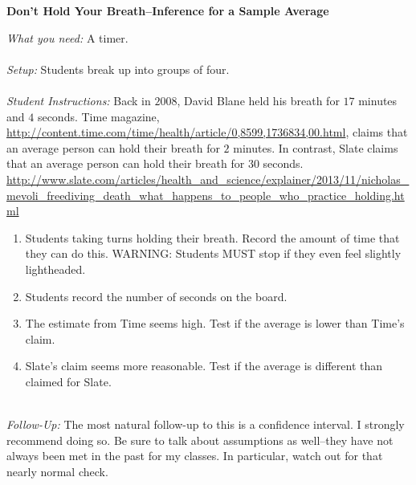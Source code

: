\documentclass[12pt]{amsart}
\theoremstyle{definition}
\begin{document}
     \begin{framed}
     	\begin{center} \textbf{Don't Hold Your Breath--Inference for a Sample Average} \end{center}
     	\emph{What you need:} A timer.\\
     	~\\
     	\emph{Setup:} Students break up into groups of four.\\
     	~\\
     	\emph{Student Instructions:} Back in $2008$, David Blane held his breath for $17$ minutes and $4$ seconds. Time magazine,  \url{http://content.time.com/time/health/article/0,8599,1736834,00.html}, claims that an average person can hold their breath for $2$ minutes. In contrast, Slate claims that an average person can hold their breath for $30$ seconds. \url{http://www.slate.com/articles/health_and_science/explainer/2013/11/nicholas_mevoli_freediving_death_what_happens_to_people_who_practice_holding.html}
     	\begin{enumerate}
     		\item Students taking turns holding their breath. Record the amount of time that they can do this. WARNING: Students MUST stop if they even feel slightly lightheaded.
     		\item Students record the number of seconds on the board.
     		\item The estimate from Time seems high. Test if the average is lower than Time's claim.
     		\item Slate's claim seems more reasonable. Test if the average is different than claimed for Slate.
     	\end{enumerate}
     	~\\
     	\emph{Follow-Up:} The most natural follow-up to this is a confidence interval. I strongly recommend doing so. Be sure to talk about assumptions as well--they have not always been met in the past for my classes. In particular, watch out for that nearly normal check.
     \end{framed}
  
  
       \newpage
       
\end{document}
